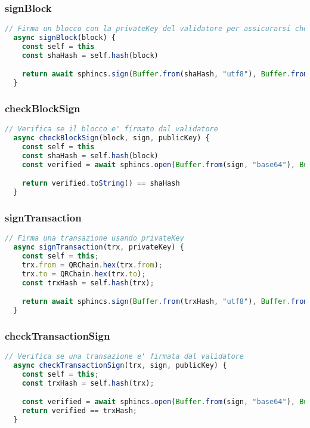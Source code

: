 \subsubsection{signBlock}
\begin{lstlisting}[language=JavaScript,breaklines]
  // Firma un blocco con la privateKey del validatore per assicurarsi che l'indirizzo appartenga al validatore; un validatore non dovrebbe essere in grado di inserire indirizzi di altri, perche' in questo modo gli verrebbero sottratti alcuni MCT.
  async signBlock(block) {
    const self = this
    const shaHash = self.hash(block)

    return await sphincs.sign(Buffer.from(shaHash, "utf8"), Buffer.from(self.validator.privateKey, 'hex'))
  }
\end{lstlisting}

\subsubsection{checkBlockSign}
\begin{lstlisting}[language=JavaScript,breaklines]
  // Verifica se il blocco e' firmato dal validatore
  async checkBlockSign(block, sign, publicKey) {
    const self = this
    const shaHash = self.hash(block)
    const verified = await sphincs.open(Buffer.from(sign, "base64"), Buffer.from(publicKey, 'hex'));

    return verified.toString() == shaHash
  }
\end{lstlisting}

\subsubsection{signTransaction}
\begin{lstlisting}[language=JavaScript,breaklines]
  // Firma una transazione usando privateKey
  async signTransaction(trx, privateKey) {
    const self = this;
    trx.from = QRChain.hex(trx.from);
    trx.to = QRChain.hex(trx.to);
    const trxHash = self.hash(trx);

    return await sphincs.sign(Buffer.from(trxHash, "utf8"), Buffer.from(privateKey, 'hex'))
  }
\end{lstlisting}

\subsubsection{checkTransactionSign}
\begin{lstlisting}[language=JavaScript,breaklines]
  // Verifica se una transazione e' firmata dal validatore
  async checkTransactionSign(trx, sign, publicKey) {
    const self = this;
    const trxHash = self.hash(trx);

    const verified = await sphincs.open(Buffer.from(sign, "base64"), Buffer.from(publicKey, 'hex'));
    return verified == trxHash;
  }
\end{lstlisting}

